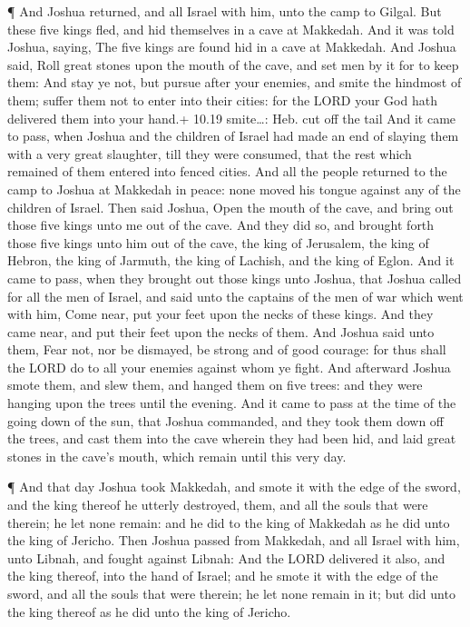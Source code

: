  ¶ And Joshua returned, and all Israel with him, unto the
camp to Gilgal.  But these five kings fled, and hid
themselves in a cave at Makkedah.  And it was told Joshua,
saying, The five kings are found hid in a cave at Makkedah.
 And Joshua said, Roll great stones upon the mouth of the
cave, and set men by it for to keep them:  And stay ye not,
but pursue after your enemies, and smite the hindmost of them; suffer
them not to enter into their cities: for the LORD your God hath
delivered them into your hand.+ 10.19 smite\ldots: Heb. cut off the tail
 And it came to pass, when Joshua and the children of
Israel had made an end of slaying them with a very great slaughter, till
they were consumed, that the rest which remained of them entered into
fenced cities.  And all the people returned to the camp to
Joshua at Makkedah in peace: none moved his tongue against any of the
children of Israel.  Then said Joshua, Open the mouth of
the cave, and bring out those five kings unto me out of the cave.
 And they did so, and brought forth those five kings unto
him out of the cave, the king of Jerusalem, the king of Hebron, the king
of Jarmuth, the king of Lachish, and the king of Eglon. 
And it came to pass, when they brought out those kings unto Joshua, that
Joshua called for all the men of Israel, and said unto the captains of
the men of war which went with him, Come near, put your feet upon the
necks of these kings. And they came near, and put their feet upon the
necks of them.  And Joshua said unto them, Fear not, nor be
dismayed, be strong and of good courage: for thus shall the LORD do to
all your enemies against whom ye fight.  And afterward
Joshua smote them, and slew them, and hanged them on five trees: and
they were hanging upon the trees until the evening.  And it
came to pass at the time of the going down of the sun, that Joshua
commanded, and they took them down off the trees, and cast them into the
cave wherein they had been hid, and laid great stones in the cave's
mouth, which remain until this very day.

 ¶ And that day Joshua took Makkedah, and smote it with the
edge of the sword, and the king thereof he utterly destroyed, them, and
all the souls that were therein; he let none remain: and he did to the
king of Makkedah as he did unto the king of Jericho.  Then
Joshua passed from Makkedah, and all Israel with him, unto Libnah, and
fought against Libnah:  And the LORD delivered it also, and
the king thereof, into the hand of Israel; and he smote it with the edge
of the sword, and all the souls that were therein; he let none remain in
it; but did unto the king thereof as he did unto the king of Jericho.

